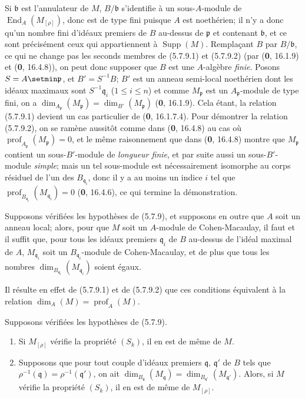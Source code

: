 Si $\mathfrak b$ est l'annulateur de $M$, $B/\mathfrak b$ s'identifie à un
sous-$A$-module de $\operatorname{End}_A(M_{[\rho]})$, donc est de type fini
puisque $A$ est noethérien; il n'y a donc qu'un nombre fini d'idéaux premiers
de $B$ au-dessus de $\mathfrak p$ et contenant $\mathfrak b$, et ce sont
précisément ceux qui appartiennent à $\operatorname{Supp}(M)$. Remplaçant
$B$ par $B/\mathfrak b$, ce qui ne change pas les seconds membres de
(5.7.9.1) et (5.7.9.2) (par (\textbf{0}, 16.1.9) et (\textbf{0}, 16.4.8)), on peut donc
supposer que $B$ est une $A$-algèbre \emph{finie}. Posons $S=A\setmin\mathfrak p$, et
$B'=S^{-1}B$; $B'$ est un anneau semi-local noethérien dont les idéaux
maximaux sont $S^{-1}\mathfrak q_i$ ($1\leq i\leq n$) et comme
$M_{\mathfrak p}$ est un $A_{\mathfrak p}$-module de type fini, on a
$\dim_{A_{\mathfrak p}}(M_{\mathfrak p})=\dim_{B'}(M_{\mathfrak p})$
(\textbf{0}, 16.1.9). Cela étant, la relation (5.7.9.1) devient un cas particulier de
(\textbf{0}, 16.1.7.4). Pour démontrer la relation (5.7.9.2), on se ramène aussitôt
comme dans (\textbf{0}, 16.4.8) au cas où
$\operatorname{prof}_{A_{\mathfrak p}}(M_{\mathfrak p})=0$, et le même
raisonnement que dans (\textbf{0}, 16.4.8) montre que $M_{\mathfrak p}$ contient un
sous-$B'$-module de \emph{longueur finie}, et par suite aussi un sous-$B'$-module
\emph{simple}; mais un tel sous-module est nécessairement isomorphe au corps
résiduel de l'un des $B_{\mathfrak q_i}$, donc il y a au moins un indice $i$
tel que
$\operatorname{prof}_{B_{\mathfrak q_i}}(M_{\mathfrak q_i})=0$
(\textbf{0}, 16.4.6), ce qui termine la démonstration.

\begin{corollary}[5.7.10]
\label{IV.2.s5.7.10-fr}
Supposons vérifiées les hypothèses de \textup{(5.7.9)}, et supposons en outre que $A$
soit un anneau local; alors, pour que $M$ soit un $A$-module de
Cohen-Macaulay, il faut et il suffit que, pour tous les idéaux premiers
$\mathfrak q_i$ de $B$ au-dessus de l'idéal maximal de $A$,
$M_{\mathfrak q_i}$ soit un $B_{\mathfrak q_i}$-module de Cohen-Macaulay, et
de plus que tous les nombres
$\dim_{B_{\mathfrak q_i}}(M_{\mathfrak q_i})$ soient égaux.
\end{corollary}

Il résulte en effet de (5.7.9.1) et de (5.7.9.2) que ces conditions
équivalent à la relation
$\dim_A(M)=\operatorname{prof}_A(M)$.

\begin{corollary}[5.7.11]
\label{IV.2.s5.7.11-fr}
Supposons vérifiées les hypothèses de \textup{(5.7.9)}.
\begin{enumerate}
\item[\textup{(i)}] Si $M_{[\rho]}$ vérifie la propriété $(S_k)$, il en est de même
de $M$.
\item[\textup{(ii)}] Supposons que pour tout couple d'idéaux premiers
$\mathfrak q$, $\mathfrak q'$ de $B$ tels que
$\rho^{-1}(\mathfrak q)=\rho^{-1}(\mathfrak q')$, on ait
$\dim_{B_{\mathfrak q}}(M_{\mathfrak q})
=\dim_{B_{\mathfrak q'}}(M_{\mathfrak q'})$. Alors, si $M$ vérifie la
propriété $(S_k)$, il en est de même de $M_{[\rho]}$.
\end{enumerate}
\end{corollary}

